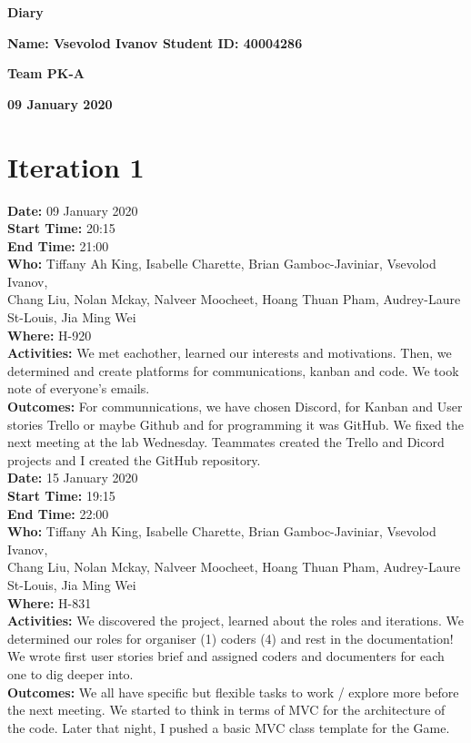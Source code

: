 \documentclass[12pt]{article}
\begin{document}
\vspace*{0.2in}
\centerline{\bf\Large Diary}

\vspace*{0.2in}
\centerline{\bf\Large Name: Vsevolod Ivanov   Student ID: 40004286}

\vspace*{0.2in}
\centerline{\bf\Large Team PK-A}

\vspace*{0.2in}
\centerline{\bf\Large 09 January 2020}

\section{Iteration 1}

{\bf Date:} 09 January 2020\\
{\bf Start Time:} 20:15\\
{\bf End Time:} 21:00 \\
{\bf Who:} Tiffany Ah King, Isabelle Charette, Brian Gamboc-Javiniar, Vsevolod Ivanov,\\
Chang Liu, Nolan Mckay, Nalveer Moocheet, Hoang Thuan Pham, Audrey-Laure St-Louis, Jia Ming Wei\\
{\bf Where:} H-920 \\
{\bf Activities:} We met eachother, learned our interests and motivations. Then, we determined and create platforms for communications, kanban and code. We took note of everyone's emails.\\
{\bf Outcomes:} For communnications, we have chosen Discord, for Kanban and User stories Trello or maybe Github and for programming it was GitHub. We fixed the next meeting at the lab Wednesday. Teammates created the Trello and Dicord projects and I created the GitHub repository.\\

{\bf Date:} 15 January 2020\\
{\bf Start Time:} 19:15\\
{\bf End Time:} 22:00\\
{\bf Who:} Tiffany Ah King, Isabelle Charette, Brian Gamboc-Javiniar, Vsevolod Ivanov,\\
Chang Liu, Nolan Mckay, Nalveer Moocheet, Hoang Thuan Pham, Audrey-Laure St-Louis, Jia Ming Wei\\
{\bf Where:} H-831\\
{\bf Activities:} We discovered the project, learned about the roles and iterations. We determined our roles for organiser (1) coders (4) and rest in the documentation! We wrote first user stories brief and assigned coders and documenters for each one to dig deeper into.\\
{\bf Outcomes:} We all have specific but flexible tasks to work / explore more before the next meeting. We started to think in terms of MVC for the architecture of the code. Later that night, I pushed a basic MVC class template for the Game.\\\\
\end{document}
